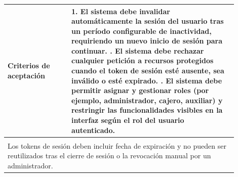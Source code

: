 \begin{longtable}{|p{0.25\linewidth}|p{0.15\linewidth}|p{0.15\linewidth}|p{0.35\linewidth}|}
		\cellcolor{tableheaderblue}\textbf{Criterios de aceptación} & \multicolumn{3}{p{0.70\linewidth}|}{                                                                                                                       %
			1. El sistema debe invalidar automáticamente la sesión del usuario tras un período configurable de inactividad, requiriendo un nuevo inicio de sesión para continuar. \newline
			2. El sistema debe rechazar cualquier petición a recursos protegidos cuando el token de sesión esté ausente, sea inválido o esté expirado. \newline
		3. El sistema debe permitir asignar y gestionar roles (por ejemplo, administrador, cajero, auxiliar) y restringir las funcionalidades visibles en la interfaz según el rol del usuario autenticado.}                     \\ \hline
		\rowcolor{tableheaderblue}
		\multicolumn{4}{|l|}{\textbf{Restricciones}}                                                                                                                                                                             \\ \hline
		\multicolumn{4}{|p{0.96\linewidth}|}{%
		Los tokens de sesión deben incluir fecha de expiración y no pueden ser reutilizados tras el cierre de sesión o la revocación manual por un administrador.}                                                               \\ \hline
	
\end{longtable}
\endgroup


